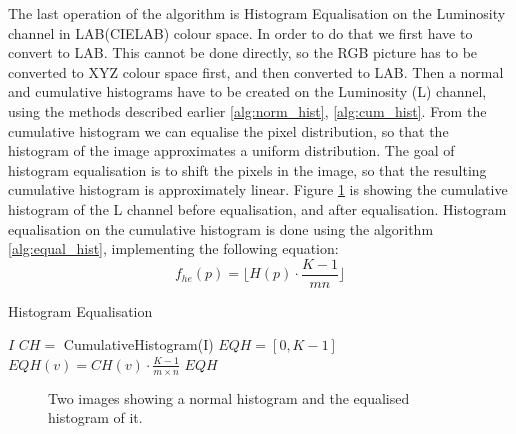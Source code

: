 \documentclass[journal,transmag]{IEEEtran}
\begin{document}
The last operation of the algorithm is Histogram Equalisation on the Luminosity channel in LAB(CIELAB) colour space. In order to do that we first have to convert to LAB. This cannot be done directly, so the RGB picture has to be converted to XYZ colour\cite{rgbTOxyz} space first, and then converted to LAB\cite{xyzTOlab}. Then a normal and cumulative histograms have to be created on the Luminosity (L) channel, using the methods described earlier \ref{alg:norm_hist}, \ref{alg:cum_hist}. From the cumulative histogram we can equalise the pixel distribution, so that the histogram of the image approximates a uniform distribution. The goal of histogram equalisation is to shift the pixels in the image, so that the resulting cumulative histogram is approximately linear. \cite{automaticContrast} Figure \ref{fig:equal_hist} is showing the cumulative histogram of the L channel before equalisation, and after equalisation. Histogram equalisation on the cumulative histogram is done using the algorithm \ref{alg:equal_hist}, implementing the following equation: 
\begin{equation}
f_{he}(p) = \lfloor H(p) \cdot \frac{K - 1}{mn}\rfloor
\end{equation}
\begin{algorithm}[h!] %
	\caption{Histogram Equalisation}
	\label{alg:equal_hist}
	\begin{algorithmic}[1]
		 {$I$} 
		\State $CH =$ CumulativeHistogram(I)
		\State $EQH = [0, K-1]$
		\State
		\State $EQH(v) = CH(v)\cdot\frac{K-1}{m \times n}$
		\EndFor
		\State 
		\State
		\Return $EQH$
		\EndFunction
	\end{algorithmic}
\end{algorithm}
\begin{figure}
		\centering
		\caption{Two images showing a normal histogram and the equalised histogram of it.}
		\label{fig:equal_hist}
\end{figure}
\end{document}
